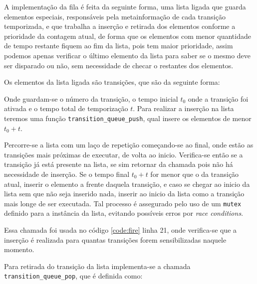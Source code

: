 A implementação da fila é feita da seguinte forma, uma lista ligada que guarda elementos especiais, responsáveis pela metainformação de cada transição temporizada, e que trabalha a inserção e retirada dos elementos conforme a prioridade da contagem atual, de forma que os elementos com menor quantidade de tempo restante fiquem ao fim da lista, pois tem maior prioridade, assim podemos apenas verificar o último elemento da lista para saber se o mesmo deve ser disparado ou não, sem necessidade de checar o restantes dos elementos.

Os elementos da lista ligada são transições, que são da seguinte forma:



Onde guardam-se o número da transição, o tempo inicial $t_0$ onde a transição foi ativada e o tempo total de temporização $t$. Para realizar a inserção na lista teremos uma função \lstinline{transition_queue_push}, qual insere os elementos de menor $t_0 + t$.



Percorre-se a lista com um laço de repetição começando-se ao final, onde estão as transições mais próximas de executar, de volta ao inicio. Verifica-se então se a transição já está presente na lista, se sim retornar da chamada pois não há necessidade de inserção. Se o tempo final $t_0 + t$ for menor que o da transição atual, inserir o elemento a frente daquela transição, e caso se chegar ao inicio da lista sem que não seja inserido nada, inserir ao inicio da lista como a transição mais longe de ser executada. Tal processo é assegurado pelo uso de um \lstinline{mutex} definido para a instância da lista, evitando possíveis erros por \textit{race conditions}.

Essa chamada foi usada no código \ref{code:fire} linha 21, onde verifica-se que a inserção é realizada para quantas transições forem sensibilizadas naquele momento.

Para retirada do transição da lista implementa-se a chamada \lstinline{transition_queue_pop}, que é definida como:



